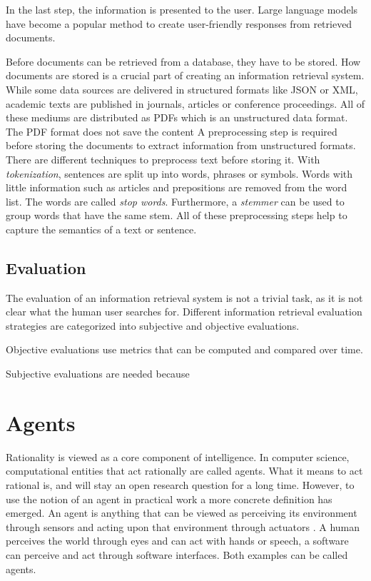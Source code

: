 \documentclass[../main.tex]{subfiles}
\begin{document}
In the last step, the information is presented to the user.
Large language models have become a popular method to create user-friendly responses from retrieved documents.


Before documents can be retrieved from a database,
they have to be stored.
How documents are stored is a crucial part of creating an information retrieval system.
While some data sources are delivered in structured formats like JSON or XML,
academic texts are published in journals, articles or conference proceedings.
All of these mediums are distributed as PDFs which is an unstructured data format.
The PDF format does not save the content
A preprocessing step is required before storing the documents to extract information from unstructured formats.
There are different techniques to preprocess text before storing it.
With \emph{tokenization}, sentences are split up into words, phrases or symbols.
Words with little information such as articles and prepositions are removed from the word list.
The words are called \emph{stop words}.
Furthermore, a \emph{stemmer} can be used to group words that have the same stem.
All of these preprocessing steps help to capture the semantics of a text or sentence.


\subsection{Evaluation}

The evaluation of an information retrieval system is not a trivial task, as it is not clear what the human user searches for.
Different information retrieval evaluation strategies are categorized into subjective and objective evaluations.

Objective evaluations use metrics that can be computed and compared over time.

Subjective evaluations are needed because

\section{Agents}
\label{sec:agents}
Rationality is viewed as a core component of intelligence.
In computer science, computational entities that act rationally are called agents.
What it means to act rational is, and will stay an open research question for a long time.
However, to use the notion of an agent in practical work a more concrete definition has emerged.
An agent is anything that can be viewed as perceiving its environment through sensors
and acting upon that environment through actuators \cite{Russel2022}.
A human perceives the world through eyes and can act with hands or speech,
a software can perceive and act through software interfaces.
Both examples can be called agents.
\end{document}
